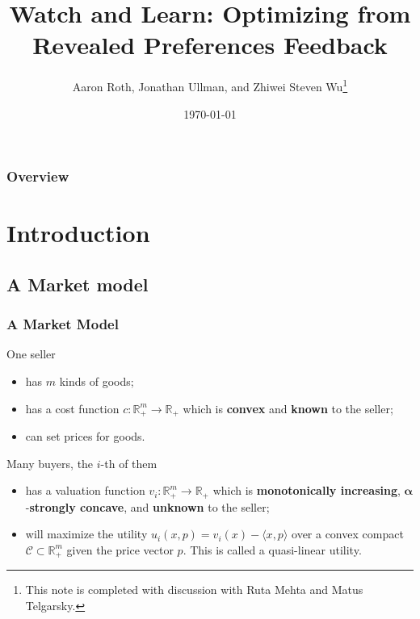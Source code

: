 \documentclass{beamer}
\title[Revealed Preference]{Watch and Learn: Optimizing from Revealed Preferences Feedback} %
\author{Aaron Roth, Jonathan Ullman, and Zhiwei Steven Wu\footnote{This note is completed with discussion with Ruta Mehta and Matus Telgarsky.}} %
\institute[] %
{
 \\ %
\medskip
\textit{} %
}
\date{\today} %
\begin{document}
\begin{frame}
\titlepage %
\end{frame}

\begin{frame}
\frametitle{Overview} %
\tableofcontents %
\end{frame}


\section{Introduction} %

\subsection{A Market model} %

\begin{frame}
\frametitle{A Market Model}
One seller
\begin{itemize}
    \item has $m$ kinds of goods;
    \item has a cost function $c:\mathbb{R}_+^m\rightarrow \mathbb{R}_+$ which is \textbf{convex} and \textbf{known} to the seller;
    \item can set prices for goods.
\end{itemize}
Many buyers, the $i$-th of them
\begin{itemize}
    \item has a valuation function $v_i:\mathbb{R}_+^m\rightarrow \mathbb{R}_+$ which is \textbf{monotonically increasing}, $\boldsymbol{\alpha}$-\textbf{strongly concave}, and \textbf{unknown} to the seller;
    \item will maximize the utility $u_i(x,p)=v_i(x)-\langle x,p\rangle$ over a convex compact $\mathcal{C}\subset \mathbb{R}_+^m$ given the price vector $p$. This is called a quasi-linear utility.
\end{itemize}
\end{frame}
\end{document}
